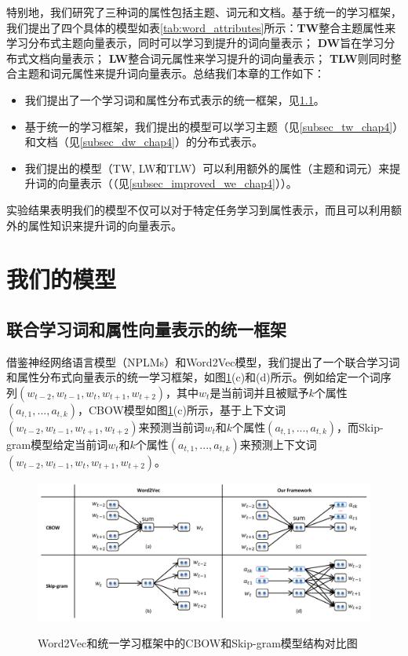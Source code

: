 \documentclass[master]{njuthesis}
\begin{document}
特别地，我们研究了三种词的属性包括主题、词元和文档。基于统一的学习框架，我们提出了四个具体的模型如表\ref{tab:word_attributes}所示：\textbf{TW}整合主题属性来学习分布式主题向量表示，同时可以学习到提升的词向量表示； \textbf{DW}旨在学习分布式文档向量表示； \textbf{LW}整合词元属性来学习提升的词向量表示； \textbf{TLW}则同时整合主题和词元属性来提升词向量表示。总结我们本章的工作如下：

\begin{itemize}
\item 我们提出了一个学习词和属性分布式表示的统一框架，见\ref{subsec_unifiedfk_chap4}。
\item 基于统一的学习框架，我们提出的模型可以学习主题（见\ref{subsec_tw_chap4}）和文档（见\ref{subsec_dw_chap4}）的分布式表示。
\item 我们提出的模型（TW, LW和TLW）可以利用额外的属性（主题和词元）来提升词的向量表示（（见\ref{subsec_improved_we_chap4}））。
\end{itemize}

实验结果表明我们的模型不仅可以对于特定任务学习到属性表示，而且可以利用额外的属性知识来提升词的向量表示。


\section{我们的模型}\label{sec_our_models_chap4}

\subsection{联合学习词和属性向量表示的统一框架}\label{subsec_unifiedfk_chap4}

借鉴神经网络语言模型（NPLMs）和Word2Vec模型，我们提出了一个联合学习词和属性分布式向量表示的统一学习框架，如图\ref{fig:ourfk_chap4}(c)和(d)所示。例如给定一个词序列$(w_{t-2}, w_{t-1}, w_t, w_{t+1}, w_{t+2})$，其中$w_t$是当前词并且被赋予$k$个属性$(a_{t,1}, ..., a_{t,k})$，CBOW模型如图\ref{fig:ourfk_chap4}(c)所示，基于上下文词$(w_{t-2}, w_{t-1}, w_{t+1}, w_{t+2})$来预测当前词$w_t$和$k$个属性$(a_{t,1}, ..., a_{t,k})$，而Skip-gram模型给定当前词$w_t$和$k$个属性$(a_{t,1}, ..., a_{t,k})$来预测上下文词$(w_{t-2}, w_{t-1}, w_t, w_{t+1}, w_{t+2})$。

\begin{figure}[htbp]
  \centering
  \includegraphics[width= 1.0\textwidth]{figures//our_framework_chap4.pdf}\\
  \caption{Word2Vec和统一学习框架中的CBOW和Skip-gram模型结构对比图}\label{fig:ourfk_chap4}
\end{figure}
\end{document}
